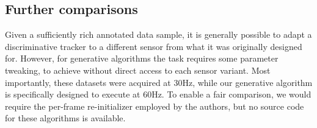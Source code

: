 \subsection*{Further comparisons}
Given a sufficiently rich annotated data sample, it is generally possible to adapt a discriminative tracker to a different sensor from what it was originally designed for. However, for generative algorithms the task requires some parameter tweaking,  to achieve without direct access to each sensor variant. 
Most importantly, these datasets were acquired at 30Hz, while our generative algorithm is specifically designed to execute at 60Hz. To enable a fair comparison, we would require the  per-frame re-initializer employed by the authors, but no source code for these algorithms is available.

